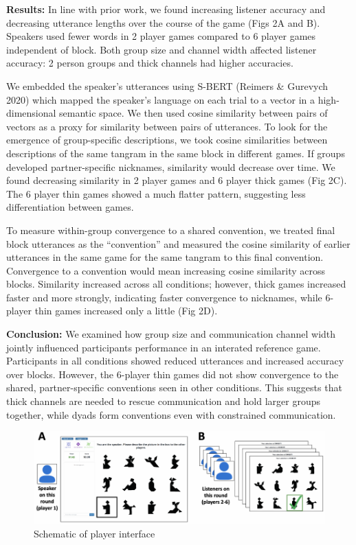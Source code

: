 \documentclass[11pt,a4paper]{article}
\begin{document}

\textbf{Results:} In line with prior work, we found increasing listener accuracy and decreasing utterance lengths over the course of the game (Figs 2A and B). Speakers used fewer words in 2 player games compared to 6 player games independent of block. Both group size and channel width affected listener accuracy: 2 person groups and thick channels had higher accuracies. 

We embedded the speaker's utterances using S-BERT (Reimers \& Gurevych 2020) which mapped the speaker's language on each trial to a vector in a high-dimensional semantic space. We then used cosine similarity between pairs of vectors as a proxy for similarity between pairs of utterances. To look for the emergence of group-specific descriptions, we took cosine similarities between descriptions of the same tangram in the same block in different games. If groups developed partner-specific nicknames, similarity would decrease over time. We found decreasing similarity in 2 player games and 6 player thick games (Fig 2C). The 6 player thin games showed a much flatter pattern, suggesting less differentiation between games. 

To measure within-group convergence to a shared convention, we treated final block utterances as the ``convention'' and measured the cosine similarity of earlier utterances in the same game for the same tangram to this final convention. Convergence to a convention would mean increasing cosine similarity across blocks. Similarity increased across all conditions; however, thick games increased faster and more strongly, indicating faster convergence to nicknames, while 6-player thin games increased only a little (Fig 2D). 

\textbf{Conclusion:} We examined how group size and communication channel width jointly influenced participants performance in an interated reference game. Participants in all conditions showed reduced utterances and increased accuracy over blocks. However, the 6-player thin games did not show convergence to the shared, partner-specific conventions seen in other conditions. This suggests that thick channels are needed to rescue communication and hold larger groups together, while dyads form conventions even with constrained communication. 

\newpage

\begin{figure}
	\includegraphics[width=\textwidth]{../images/interface-1.pdf}
	\caption{Schematic of player interface}
\end{figure}
\end{document}
